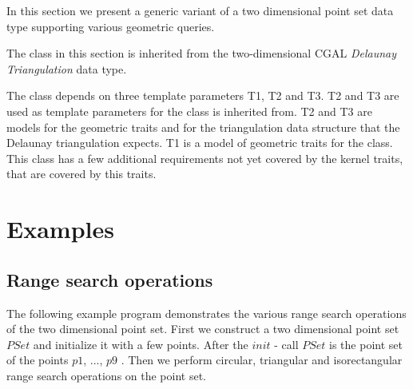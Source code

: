 In this section we present a generic variant of a two dimensional point set
data type supporting various geometric queries.

The  class in this section is inherited
from the two-dimensional CGAL {\em Delaunay Triangulation} data type.

The  class depends on three template parameters T1, T2 and T3.
T2 and T3 are used as template parameters for the 
class  is inherited from. T2 and T3 are models for the
geometric traits and for the triangulation data structure that the Delaunay triangulation
expects.
T1 is a model of geometric traits for the  class.
This class has a few additional requirements not yet covered by the kernel traits, that
are covered by this traits.

\section{Examples}

\subsection{Range search operations}

The following example program demonstrates the various range search operations
of the two dimensional point set.
First we construct a two dimensional point set $PSet$ and initialize it with a few points.
After the $init$ - call $PSet$ is the point set of the points $p1$, ..., $p9$ .
Then we perform circular, triangular and isorectangular range search operations on the
point set.

\ccHtmlLinksOff

